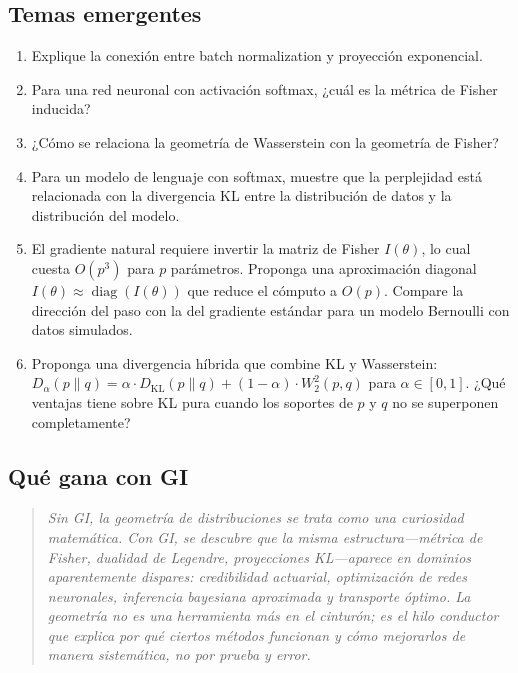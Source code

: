\subsection*{Temas emergentes}
\begin{enumerate}[resume]
	\item[$\star$] Explique la conexión entre batch normalization y proyección exponencial.
	\item[$\star$] Para una red neuronal con activación softmax, ¿cuál es la métrica de Fisher inducida?
	\item[$\star$] ¿Cómo se relaciona la geometría de Wasserstein con la geometría de Fisher?
	\item[$\star\star\star$] Para un modelo de lenguaje con softmax, muestre que la perplejidad está relacionada con la divergencia KL entre la distribución de datos y la distribución del modelo.
	\item[$\star\star\star$] El gradiente natural requiere invertir la matriz de Fisher $I(\theta)$, lo cual cuesta $O(p^3)$ para $p$ parámetros. Proponga una aproximación diagonal $I(\theta) \approx \operatorname{diag}(I(\theta))$ que reduce el cómputo a $O(p)$. Compare la dirección del paso con la del gradiente estándar para un modelo Bernoulli con datos simulados.
	\item[$\star\star\star$] Proponga una divergencia híbrida que combine KL y Wasserstein: $D_\alpha(p \| q) = \alpha \cdot D_{\mathrm{KL}}(p \| q) + (1-\alpha) \cdot W_2^2(p,q)$ para $\alpha \in [0,1]$. ¿Qué ventajas tiene sobre KL pura cuando los soportes de $p$ y $q$ no se superponen completamente?
\end{enumerate}

\subsection*{Qué gana con GI}
\begin{quote}
	\itshape
	Sin GI, la geometría de distribuciones se trata como una curiosidad matemática.  Con GI, se descubre que la misma estructura---métrica de Fisher, dualidad de Legendre, proyecciones KL---aparece en dominios aparentemente dispares: credibilidad actuarial, optimización de redes neuronales, inferencia bayesiana aproximada y transporte óptimo.  La geometría no es una herramienta más en el cinturón; es el hilo conductor que explica por qué ciertos métodos funcionan y cómo mejorarlos de manera sistemática, no por prueba y error.
\end{quote}

